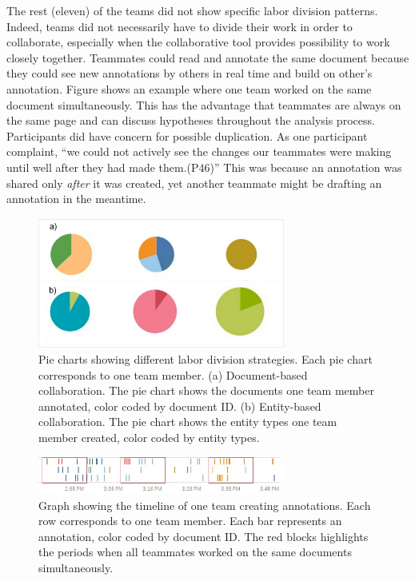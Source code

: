 The rest (eleven) of the teams did not show specific labor division
patterns. Indeed, teams did not necessarily have to divide their work in
order to collaborate, especially when the collaborative tool provides
possibility to work closely together. Teammates could read and annotate
the same document because they could see new annotations by others in
real time and build on other's annotation. Figure
\autocite{fig:close_collaboration} shows an example where one team
worked on the same document simultaneously. This has the advantage that
teammates are always on the same page and can discuss hypotheses
throughout the analysis process. Participants did have concern for
possible duplication. As one participant complaint, ``we could not
actively see the changes our teammates were making until well after they
had made them.(P46)'' This was because an annotation was shared only
\emph{after} it was created, yet another teammate might be drafting an
annotation in the meantime.

\begin{figure}
\centering
\includegraphics[width=3.20000in]{img/labor_division.jpg}
\caption{Pie charts showing different labor division strategies. Each
pie chart corresponds to one team member. (a) Document-based
collaboration. The pie chart shows the documents one team member
annotated, color coded by document ID. (b) Entity-based collaboration.
The pie chart shows the entity types one team member created, color
coded by entity types.\label{fig:labor_division}}
\end{figure}

\begin{figure}
\centering
\includegraphics[width=3.20000in]{img/close_collaboration.jpg}
\caption{Graph showing the timeline of one team creating annotations.
Each row corresponds to one team member. Each bar represents an
annotation, color coded by document ID. The red blocks highlights the
periods when all teammates worked on the same documents
simultaneously.\label{fig:close_collaboration}}
\end{figure}
